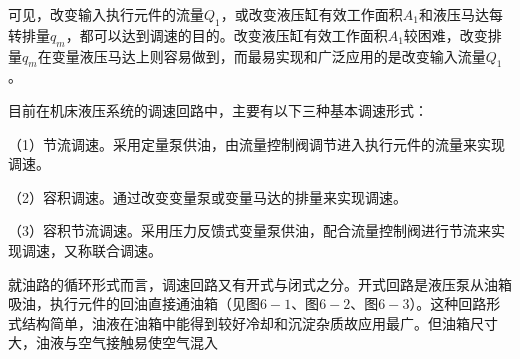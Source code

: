 可见，改变输入执行元件的流量$Q_{1}$，或改变液压缸有效工作面积$A_{1}$和液压马达每转排量$q_{m}$，都可以达到调速的目的。改变液压缸有效工作面积$A_{1}$较困难，改变排量$q_{m}$在变量液压马达上则容易做到，而最易实现和广泛应用的是改变输入流量$Q_{1}$。

目前在机床液压系统的调速回路中，主要有以下三种基本调速形式：

（1）节流调速。采用定量泵供油，由流量控制阀调节进入执行元件的流量来实现调速。

（2）容积调速。通过改变变量泵或变量马达的排量来实现调速。

（3）容积节流调速。采用压力反馈式变量泵供油，配合流量控制阀进行节流来实现调速，又称联合调速。

就油路的循环形式而言，调速回路又有开式与闭式之分。开式回路是液压泵从油箱吸油，执行元件的回油直接通油箱（见图$6-1$、图$6-2$、图$6-3$）。这种回路形式结构简单，油液在油箱中能得到较好冷却和沉淀杂质故应用最广。但油箱尺寸大，油液与空气接触易使空气混入















